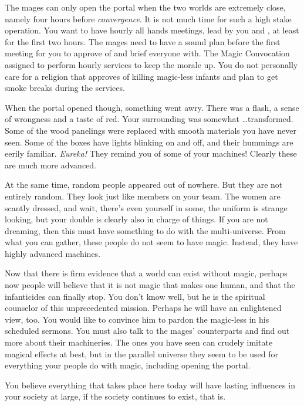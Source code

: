 \documentclass[char]{guildcamp3}
\begin{document}
The mages can only open the portal when the two worlds are extremely close, namely four hours before \emph{convergence}. It is not much time for such a high stake operation. You want to have hourly all hands meetings, lead by you and \cNobleOne{}, at least for the first two hours. The mages need to have a sound plan before the first meeting for you to approve of and brief everyone with. The Magic Convocation assigned \cPaladin{} to perform hourly services to keep the morale up. You do not personally care for a religion that approves of killing magic-less infants and plan to get smoke breaks during the services.

When the portal opened though, something went awry. There was a flash, a sense of wrongness and a taste of red. Your surrounding was somewhat \ldots transformed. Some of the wood panelings were replaced with smooth materials you have never seen. Some of the boxes have lights blinking on and off, and their hummings are eerily familiar. \emph{Eureka!} They remind you of some of your machines! Clearly these are much more advanced. 

At the same time, random people appeared out of nowhere. But they are not entirely random. They look just like members on your team. The women are scantly dressed, and wait, there's even yourself in some, the uniform is strange looking, but your double is clearly also in charge of things. If you are not dreaming, then this must have something to do with the multi-universe. From what you can gather, these people do not seem to have magic. Instead, they have highly advanced machines.

Now that there is firm evidence that a world can exist without magic, perhaps now people will believe that it is not magic that makes one human, and that the infanticides can finally stop. You don't know \cPaladin{} well, but he is the spiritual counselor of this unprecedented mission. Perhaps he will have an enlightened view, too. You would like to convince him to pardon the magic-less in his scheduled sermons. You must also talk to the mages' counterparts and find out more about their machineries. The ones you have seen can crudely imitate magical effects at best, but in the parallel universe they seem to be used for everything your people do with magic, including opening the portal. 

You believe everything that takes place here today will have lasting influences in your society at large, if the society continues to exist, that is.
\end{document}
